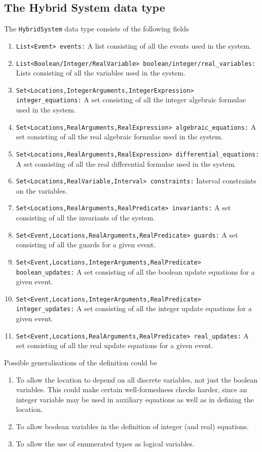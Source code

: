 \documentclass[a4paper,11pt]{article}
\begin{document}
\subsection*{The Hybrid System data type}

The \texttt{HybridSystem} data type consists of the following fields
\begin{enumerate}[(H1)]
 \item \texttt{List<Event> events:} A list consisting of all the events used in the system.
 \item \texttt{List<Boolean/Integer/RealVariable> boolean/integer/real\_variables:} Lists consisting of all the variables used in the system.
 \item \texttt{Set<Locations,IntegerArguments,IntegerExpression> integer\_equations:} A set consisting of all the integer algebraic formulae used in the system.
 \item \texttt{Set<Locations,RealArguments,RealExpression> algebraic\_equations:} A set consisting of all the real algebraic formulae used in the system.
 \item \texttt{Set<Locations,RealArguments,RealExpression> differential\_equations:} A set consisting of all the real differential formulae used in the system.
 \item \texttt{Set<Locations,RealVariable,Interval> constraints:} Interval constraints on the variables.
 \item \texttt{Set<Locations,RealArguments,RealPredicate> invariants:} A set consisting of all the invariants of the system.
 \item \texttt{Set<Event,Locations,RealArguments,RealPredicate> guards:} A set consisting of all the guards for a given event.
 \item \texttt{Set<Event,Locations,IntegerArguments,RealPredicate> boolean\_updates:} A set consisting of all the boolean update equations for a given event.
 \item \texttt{Set<Event,Locations,IntegerArguments,RealPredicate> integer\_updates:} A set consisting of all the integer update equations for a given event.
 \item \texttt{Set<Event,Locations,RealArguments,RealPredicate> real\_updates:} A set consisting of all the real update equations for a given event.
\end{enumerate}

Possible generalisations of the definition could be
\begin{enumerate}[(G1)]
 \item To allow the location to depend on all discrete variables, not just the boolean variables. This could make certain well-formedness checks harder, since an integer variable may be used in auxiliary equations as well as in defining the location.
 \item To allow boolean variables in the definition of integer (and real) equations.
 \item To allow the use of enumerated types as logical variables.
\end{enumerate}
\end{document}
